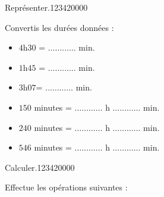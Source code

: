 \begin{pageAuto} 


\begin{ExoAuto}{ Représenter.}{1234}{2}{0}{0}{0}{0}

Convertis les durées données :\vspace{0.2cm}

\begin{minipage}{0.50\linewidth}
 \begin{itemize}
 \item $4$h$30$ =  $\ldots \ldots\ldots\ldots $ min.  \vspace{0.2cm}
 \item $1$h$45$ =  $\ldots \ldots\ldots\ldots $ min. \vspace{0.2cm}
 \item $3$h$07$=  $\ldots \ldots\ldots\ldots $ min. \vspace{0.2cm}
 \end{itemize}
\end{minipage}
\begin{minipage}{0.50\linewidth}
 \begin{itemize}
 \item $150$ minutes  =  $\ldots \ldots \ldots \ldots $ h $\ldots \ldots \ldots \ldots $ min. \vspace{0.2cm}
 \item $240$ minutes = $\ldots \ldots \ldots \ldots $ h $\ldots \ldots \ldots \ldots $ min. \vspace{0.2cm}
 \item $546$ minutes = $\ldots \ldots \ldots \ldots $ h $\ldots \ldots \ldots \ldots $ min. \vspace{0.2cm}
 \end{itemize}
\end{minipage}

\end{ExoAuto}

\begin{ExoAuto}{ Calculer.}{1234}{2}{0}{0}{0}{0}
 
 
 Effectue  les opérations suivantes :
 

\end{ExoAuto}
\end{pageAuto}
